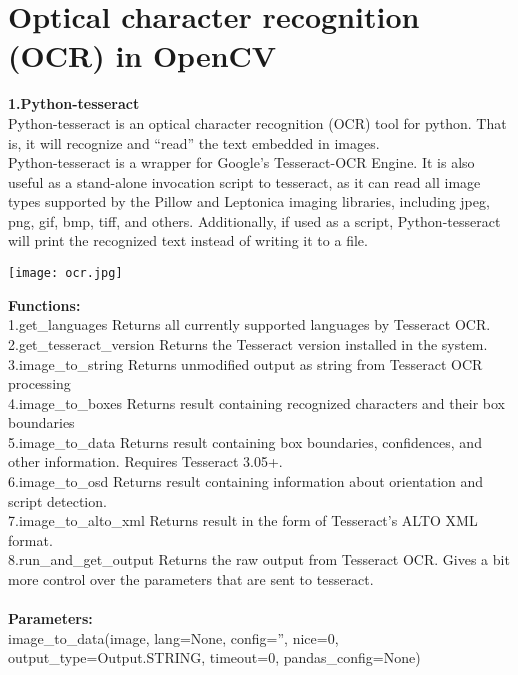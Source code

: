 \documentclass[12pt,a4paper]{report}
\begin{document}
\section{Optical character recognition (OCR) in OpenCV}
\textbf{1.Python-tesseract\\}
Python-tesseract is an optical character recognition (OCR) tool for python. That is, it will recognize and “read” the text embedded in images.\\
Python-tesseract is a wrapper for Google’s Tesseract-OCR Engine. It is also useful as a stand-alone invocation script to tesseract, as it can read all image types supported by the Pillow and Leptonica imaging libraries, including jpeg, png, gif, bmp, tiff, and others. Additionally, if used as a script, Python-tesseract will print the recognized text instead of writing it to a file.\\
\begin{center}
\texttt{[image: ocr.jpg]}
\begin{figure}[h!]
\caption{}
\end{figure}
\end{center}
\textbf{Functions:}\\
1.get\_languages Returns all currently supported languages by Tesseract OCR.\\
2.get\_tesseract\_version Returns the Tesseract version installed in the system.\\
3.image\_to\_string Returns unmodified output as string from Tesseract OCR processing\\
4.image\_to\_boxes Returns result containing recognized characters and their box boundaries\\
5.image\_to\_data Returns result containing box boundaries, confidences, and other information. Requires Tesseract 3.05+.\\ 
6.image\_to\_osd Returns result containing information about orientation and script detection.\\
7.image\_to\_alto\_xml Returns result in the form of Tesseract’s ALTO XML format.\\
8.run\_and\_get\_output Returns the raw output from Tesseract OCR. Gives a bit more control over the parameters that are sent to tesseract.\\\\
\textbf{Parameters:}\\
image\_to\_data(image, lang=None, config='', nice=0, output\_type=Output.STRING, timeout=0, pandas\_config=None)
\newpage
\end{document}
